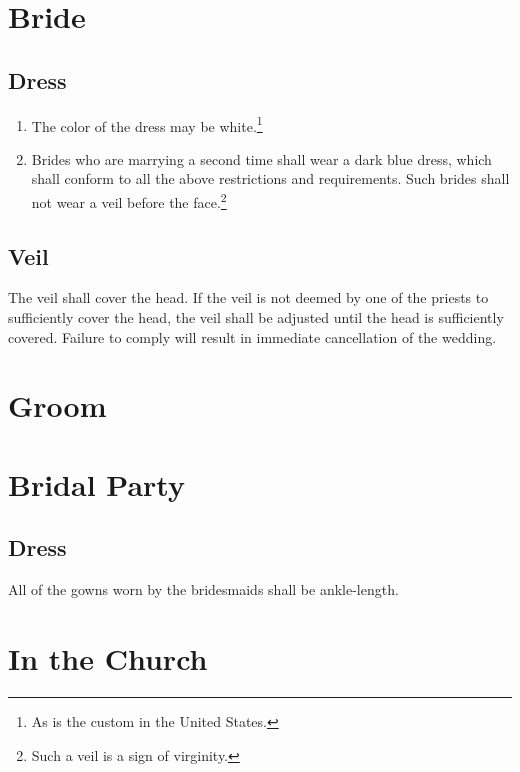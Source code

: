 \documentclass{article}
\begin{document}
\section{Bride}

\subsection{Dress}

\begin{enumerate}
    \item The color of the dress may be white.\footnote{As is the custom in the
        United States.}
    \item Brides who are marrying a second time shall wear a dark blue dress,
        which shall conform to all the above restrictions and requirements. Such
        brides shall not wear a veil before the face.\footnote{Such a veil is a
        sign of virginity.}
\end{enumerate}


\subsection{Veil}

The veil shall cover the head. If the veil is not deemed by one of the priests
to sufficiently cover the head, the veil shall be adjusted until the head is
sufficiently covered. Failure to comply will result in immediate cancellation of
the wedding.


\section{Groom}


\section{Bridal Party}

\subsection{Dress}

All of the gowns worn by the bridesmaids shall be ankle-length.


\section{In the Church}
\end{document}
